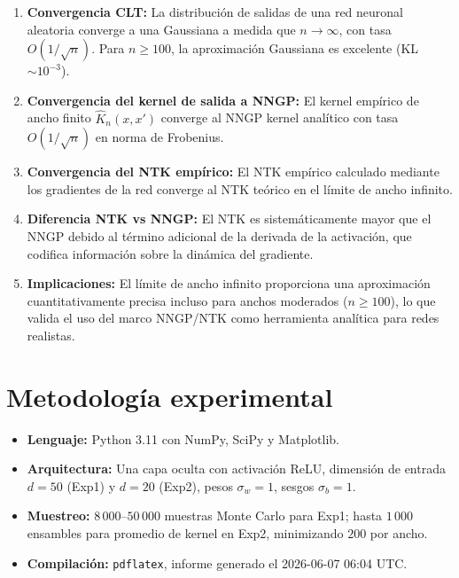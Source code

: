 \documentclass[11pt,a4paper]{article}
\begin{document}
\begin{enumerate}
  \item \textbf{Convergencia CLT:} La distribución de salidas de una red neuronal aleatoria converge a una Gaussiana a medida que $n \to \infty$, con tasa $O(1/\sqrt{n})$. Para $n \geq 100$, la aproximación Gaussiana es excelente (KL $\sim 10^{-3}$).
  
  \item \textbf{Convergencia del kernel de salida a NNGP:} El kernel empírico de ancho finito $\hat{K}_n(x,x')$ converge al NNGP kernel analítico con tasa $O(1/\sqrt{n})$ en norma de Frobenius.
  
  \item \textbf{Convergencia del NTK empírico:} El NTK empírico calculado mediante los gradientes de la red converge al NTK teórico en el límite de ancho infinito.
  
  \item \textbf{Diferencia NTK vs NNGP:} El NTK es sistemáticamente mayor que el NNGP debido al término adicional de la derivada de la activación, que codifica información sobre la dinámica del gradiente.
  
  \item \textbf{Implicaciones:} El límite de ancho infinito proporciona una aproximación cuantitativamente precisa incluso para anchos moderados ($n \geq 100$), lo que valida el uso del marco NNGP/NTK como herramienta analítica para redes realistas.
\end{enumerate}

\section*{Metodología experimental}

\begin{itemize}
  \item \textbf{Lenguaje:} Python 3.11 con NumPy, SciPy y Matplotlib.
  \item \textbf{Arquitectura:} Una capa oculta con activación ReLU, dimensión de entrada $d=50$ (Exp1) y $d=20$ (Exp2), pesos $\sigma_w=1$, sesgos $\sigma_b=1$.
  \item \textbf{Muestreo:} $8\,000$--$50\,000$ muestras Monte Carlo para Exp1; hasta $1\,000$ ensambles para promedio de kernel en Exp2, minimizando $200$ por ancho.
  \item \textbf{Compilación:} \texttt{pdflatex}, informe generado el 2026-06-07 06:04 UTC.
\end{itemize}
\end{document}
